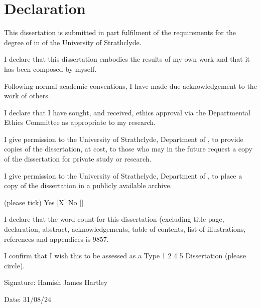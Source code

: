 \section*{Declaration}
This dissertation is submitted in part fulfilment of the requirements for the degree of \degreename\; in \coursename\; of the University of Strathclyde. 

I declare that this dissertation embodies the results of my own work and that it has been composed by myself. 

Following normal academic conventions, I have made due acknowledgement to the work of others. 

I declare that I have sought, and received, ethics approval via the Departmental Ethics Committee as appropriate to my research. 

I give permission to the University of Strathclyde, Department of \deptname, to provide copies of the dissertation, at cost, to those who may in the future request a copy of the dissertation for private study or research. 

I give permission to the University of Strathclyde, Department of \deptname, to place a copy of the dissertation in a publicly available archive. 

(please tick) Yes [\:X\:] No [\quad] 

I declare that the word count for this dissertation (excluding title page, declaration, abstract, acknowledgements, table of contents, list of illustrations, references and appendices is 9857.


I confirm that I wish this to be assessed as a Type 1 2  4 5 Dissertation (please circle).

\vspace{10mm}

Signature: Hamish James Hartley

\vspace{10mm}

Date: 31/08/24
